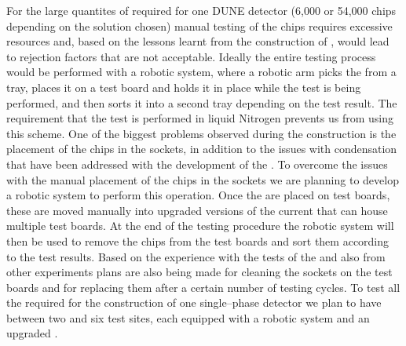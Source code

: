 For the large quantites of
 required for one DUNE  detector
(6,000 or 54,000 chips depending on the  solution
chosen) manual testing of the chips requires excessive 
resources and, based on the lessons learnt from the 
construction of , would lead to rejection
factors that are not acceptable. Ideally the entire testing
process would be performed with a robotic system, where 
a robotic arm picks the  from a tray, places
it on a test board and holds it in place while the test
is being performed, and then sorts it into a second tray
depending on the test result. The requirement that the test
is performed in liquid Nitrogen prevents us from using this
scheme. One of the biggest problems observed during the
 construction is the placement of the chips in
the sockets, in addition to the issues with condensation
that have been addressed with the development of the .
To overcome the issues with the manual placement of the chips in
the sockets we are planning to develop a robotic system
to perform this operation. Once the  are 
placed on test boards, these are moved manually into 
upgraded versions of the current  that can
house multiple test boards. At the end of the testing
procedure the robotic system will then be used to remove
the chips from the test boards and sort them according to
the test results. Based on the experience with the tests of
the   and also from other experiments
plans are also being made for cleaning the sockets on the 
test boards and for replacing them after a certain number of
testing cycles. To test all the  required for
the construction of one single--phase detector we plan to
have between two and six test sites, each equipped with a
robotic system and an upgraded .

